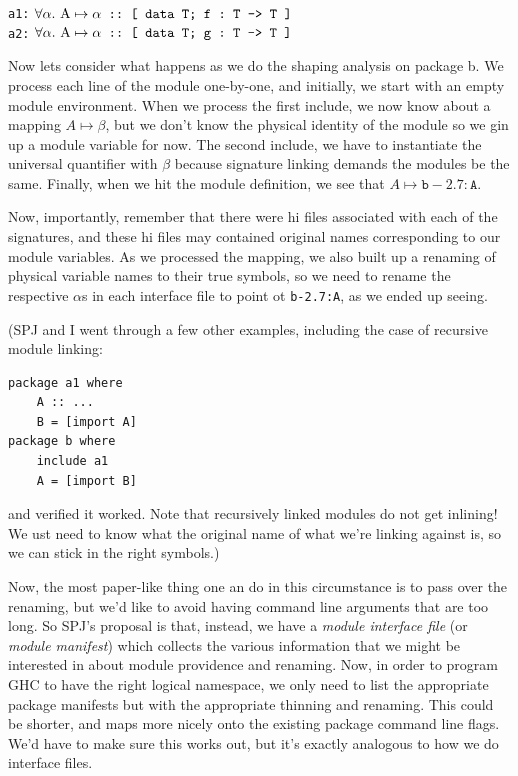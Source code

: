 \documentclass{article}
\begin{document}
\noindent
\verb|a1:| $\forall \alpha.\ \mathrm{A} \mapsto \alpha \mbox{\texttt{\ ::\ [ data T\@; f :\ T -> T ]}}$ \\ %
\verb|a2:| $\forall \alpha.\ \mathrm{A} \mapsto \alpha \mbox{\texttt{\ ::\ [ data T\@; g :\ T -> T ]}}$ %

Now lets consider what happens as we do the shaping analysis on package b.
We process each line of the module one-by-one, and initially, we start
with an empty module environment.  When we process the first include, we
now know about a mapping $A \mapsto \beta$, but we don't know the physical
identity of the module so we gin up a module variable for now.  The second
include, we have to instantiate the universal quantifier with $\beta$ because
signature linking demands the modules be the same. Finally, when we hit the
module definition, we see that $A \mapsto \mathtt{b-2.7:A}$.

Now, importantly, remember that there were hi files associated with each
of the signatures, and these hi files may contained original names
corresponding to our module variables.  As we processed the mapping, we
also built up a renaming of physical variable names to their true
symbols, so we need to rename the respective $\alpha$s in each interface
file to point ot \texttt{b-2.7:A}, as we ended up seeing.

(SPJ and I went through a few other examples, including the case of recursive
module linking:

\begin{verbatim}
package a1 where
    A :: ...
    B = [import A]
package b where
    include a1
    A = [import B]
\end{verbatim}

and verified it worked.  Note that recursively linked modules do not get
inlining! We ust need to know what the original name of what we're linking
against is, so we can stick in the right symbols.)

Now, the most paper-like thing one an do in this circumstance is to pass
over the renaming, but we'd like to avoid having command line arguments
that are too long.  So SPJ's proposal is that, instead, we have a \emph{module
interface file} (or \emph{module manifest}) which collects the various information
that we might be interested in about module providence and renaming.  Now,
in order to program GHC to have the right logical namespace, we only need
to list the appropriate package manifests but with the appropriate thinning
and renaming.  This could be shorter, and maps more nicely onto the existing
package command line flags.  We'd have to make sure this works out, but it's
exactly analogous to how we do interface files.
\end{document}
